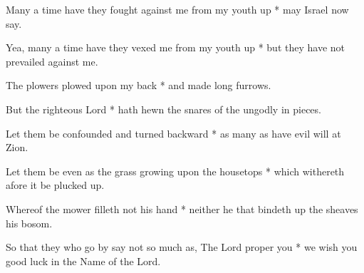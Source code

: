 \begin{multicols}{2}
	
	Many a time have they fought against me from my youth up * may Israel now say.
	
	Yea, many a time have they vexed me from my youth up * but they have not prevailed against me.
	
	The plowers plowed upon my back * and made long furrows.
	
	But the righteous Lord * hath hewn the snares of the ungodly in pieces.
	
	Let them be confounded and turned backward * as many as have evil will at Zion.
	
	Let them be even as the grass growing upon the housetops * which withereth afore it be plucked up.
	
	Whereof the mower filleth not his hand * neither he that bindeth up the sheaves his bosom.
	
	So that they who go by say not so much as, The Lord proper you * we wish you good luck in the Name of the Lord.
	
	\gloria{}
\end{multicols}